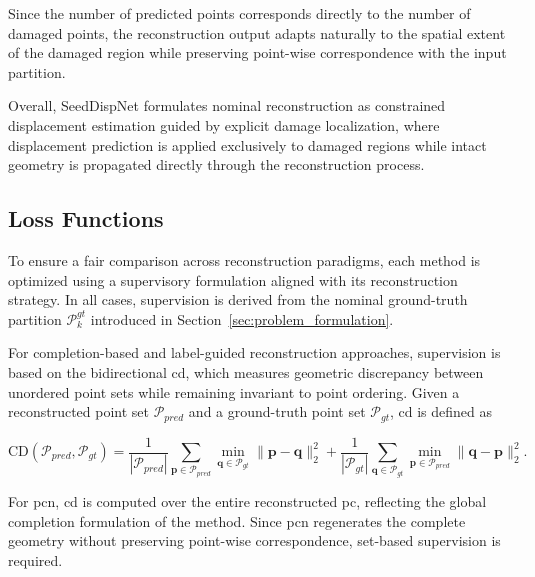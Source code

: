 Since the number of predicted points corresponds directly to the number of damaged points, the reconstruction output adapts naturally to the spatial extent of the damaged region while preserving point-wise correspondence with the input partition.

Overall, SeedDispNet formulates nominal reconstruction as constrained displacement estimation guided by explicit damage localization, where displacement prediction is applied exclusively to damaged regions while intact geometry is propagated directly through the reconstruction process. 


\subsection{Loss Functions}
\label{sec:loss_functions}

To ensure a fair comparison across reconstruction paradigms, each method is optimized using a supervisory formulation aligned with its reconstruction strategy. In all cases, supervision is derived from the nominal ground-truth partition $\mathcal{P}_{k}^{gt}$ introduced in Section~\ref{sec:problem_formulation}.

For completion-based and label-guided reconstruction approaches, supervision is based on the bidirectional \ac{cd}, which measures geometric discrepancy between unordered point sets while remaining invariant to point ordering. Given a reconstructed point set $\mathcal{P}_{pred}$ and a ground-truth point set $\mathcal{P}_{gt}$, \ac{cd} is defined as

\begin{equation}
\text{CD}(\mathcal{P}_{pred}, \mathcal{P}_{gt}) =
\frac{1}{|\mathcal{P}_{pred}|}
\sum_{\mathbf{p} \in \mathcal{P}_{pred}}
\min_{\mathbf{q} \in \mathcal{P}_{gt}}
\|\mathbf{p} - \mathbf{q}\|_2^2
+
\frac{1}{|\mathcal{P}_{gt}|}
\sum_{\mathbf{q} \in \mathcal{P}_{gt}}
\min_{\mathbf{p} \in \mathcal{P}_{pred}}
\|\mathbf{q} - \mathbf{p}\|_2^2.
\label{eq:cd}
\end{equation}


For \ac{pcn}, \ac{cd} is computed over the entire reconstructed \ac{pc}, reflecting the global completion formulation of the method. Since \ac{pcn} regenerates the complete geometry without preserving point-wise correspondence, set-based supervision is required.

